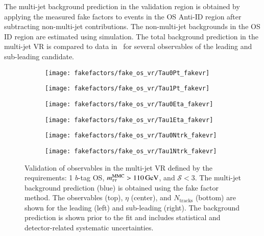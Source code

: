 The multi-jet background prediction in the validation region is
obtained by applying the measured fake factors to events in the OS
Anti-ID region after subtracting non-multi-jet contributions. The
non-multi-jet backgrounds in the OS ID region are estimated using
simulation. The total background prediction in the multi-jet VR is
compared to data in~ for several
observables of the leading and sub-leading \tauhadvis candidate.



\begin{figure}[htbp]
  \centering

  \begin{subfigure}{0.45\textwidth}
    \texttt{[image: fakefactors/fake\_os\_vr/Tau0Pt\_fakevr]}
  \end{subfigure}\hspace*{0.04\textwidth}%
  \begin{subfigure}{0.45\textwidth}
    \texttt{[image: fakefactors/fake\_os\_vr/Tau1Pt\_fakevr]}
  \end{subfigure}

  \begin{subfigure}{0.45\textwidth}
    \texttt{[image: fakefactors/fake\_os\_vr/Tau0Eta\_fakevr]}
  \end{subfigure}\hspace*{0.04\textwidth}%
  \begin{subfigure}{0.45\textwidth}
    \texttt{[image: fakefactors/fake\_os\_vr/Tau1Eta\_fakevr]}
  \end{subfigure}

  \begin{subfigure}{0.45\textwidth}
    \texttt{[image: fakefactors/fake\_os\_vr/Tau0Ntrk\_fakevr]}
  \end{subfigure}\hspace*{0.04\textwidth}%
  \begin{subfigure}{0.45\textwidth}
    \texttt{[image: fakefactors/fake\_os\_vr/Tau1Ntrk\_fakevr]}
  \end{subfigure}

  \caption{Validation of \tauhadvis observables in the multi-jet VR
    defined by the requirements: 1 $b$-tag OS,
    $m_{\tau\tau}^\text{MMC} > \SI{110}{\ensuremath{\text{GeV}}}$, and $\mathcal{S} < 3$. The multi-jet
    background prediction (blue) is obtained using the fake factor
    method. The \tauhadvis observables \pT (top), $\eta$ (center), and
    $N_{\text{tracks}}$ (bottom) are shown for the leading (left) and
    sub-leading \tauhadvis (right). The background prediction is shown
    prior to the fit and includes statistical and detector-related
    systematic uncertainties.}%
  \label{fig:fake_factor_OSVR_kinematics}%
\end{figure}


